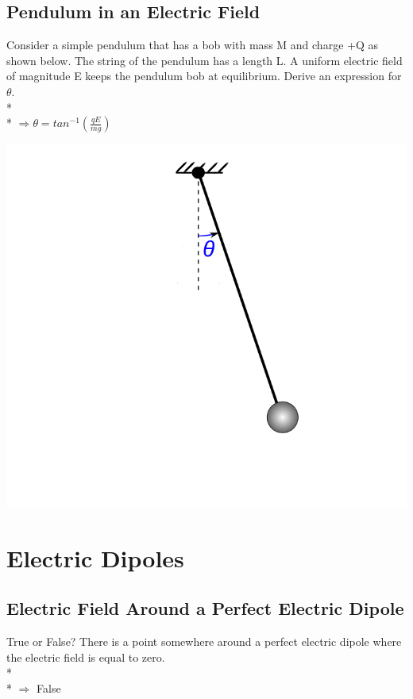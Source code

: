 \documentclass[11pt]{article}
\begin{document}
\pagebreak
\subsection{Pendulum in an Electric Field}
Consider a simple pendulum that has a bob with mass M and charge +Q as shown below.  The string of the pendulum has a length L.  A uniform electric field of magnitude E keeps the pendulum bob at equilibrium.  Derive an expression for $\theta$. \\* \\*
$\Rightarrow \theta = tan^{-1}(\frac{qE}{mg})$

\begin{center}
\includegraphics[scale=0.25]{Images/pendulum-efield.png}
\end{center}


\pagebreak
\section{Electric Dipoles}
\vspace{10pt}

\subsection{Electric Field Around a Perfect Electric Dipole}
True or False?  There is a point somewhere around a perfect electric dipole where the electric field is equal to zero.\\* \\*
$\Rightarrow$ False
\end{document}
